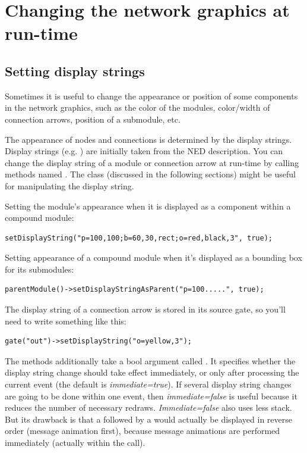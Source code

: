 \section{Changing the network graphics at run-time}

\subsection{Setting display strings}

Sometimes it is useful to change the appearance or position of
some components in the network graphics, such as the color of the
modules, color/width of connection arrows,
position of a submodule, etc.

The appearance of nodes and connections is determined by the display
strings. Display strings (e.g. )
are initially taken from the NED description.
You can change the display string of a module or connection arrow
at run-time by calling methods named .
The  class (discussed in the following sections)
might be useful for manipulating the display string.

Setting the module's appearance when it is displayed as a component
within a compound module:

\begin{verbatim}
setDisplayString("p=100,100;b=60,30,rect;o=red,black,3", true);
\end{verbatim}

Setting appearance of a compound module when it's displayed as a
bounding box for its submodules:

\begin{verbatim}
parentModule()->setDisplayStringAsParent("p=100.....", true);
\end{verbatim}

The display string of a connection arrow
is stored in its source gate, so you'll need to write something
like this:

\begin{verbatim}
gate("out")->setDisplayString("o=yellow,3");
\end{verbatim}

The  methods additionally take a bool
argument called . It specifies whether the display
string change should take effect immediately, or only after processing
the current event (the default is \textit{immediate=true}). If several
display string changes are going to be done within one event, then
\textit{immediate=false} is useful because it reduces the number of
necessary redraws. \textit{Immediate=false} also uses less stack.  But
its drawback is that a  followed by a
 would actually be displayed in reverse order (message
animation first), because message animations are performed immediately
(actually within the  call).


